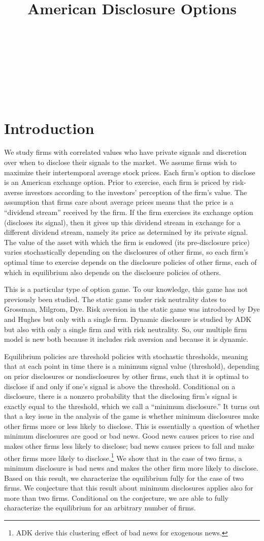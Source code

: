 \documentclass[authoryear,letterpaper,english,12pt]{elsarticle}
\title{American Disclosure Options}
\author[id=au1,addressref={add1}]{\fnms{Kerry}~\snm{Back}\ead[label=e1]{kerry.e.back@rice.edu}}
\author[id=au2,addressref={add2}]{\fnms{Bruce I.}~\snm{Carlin}\ead[label=e2]{bruce.carlin@rice.edu}}
\author[id=au3,addressref={add2}]{\fnms{Seyed Mohammad}~\snm{Kazempour}\ead[label=e3]{smkazempour@rice.edu}}
\author[id=au4,addressref={add3}]{\fnms{Chloe L.}~\snm{Xie}\ead[label=e4]{chloexie@mit.edu}}
\begin{document}
\newpage

\section{Introduction}\label{s:intro}

We study firms with correlated values who have private signals and discretion over when to disclose their signals to the market.  We assume firms wish to maximize their intertemporal average stock prices. Each firm's option to disclose is an American exchange option.  Prior to exercise, each firm is priced by risk-averse investors according to the investors' perception of the firm's value.  The assumption that firms care about average prices means that the price is a ``dividend stream'' received by the firm.  If the firm exercises its exchange option (discloses its signal), then it gives up this dividend stream in exchange for a different dividend stream, namely its price as determined by its private signal.  The value of the asset with which the firm is endowed (its pre-disclosure price) varies stochastically depending on the disclosures of other firms, so each firm's optimal time to exercise depends on the disclosure policies of other firms, each of which in equilibrium also depends on the disclosure policies of others.

This is a particular type of option game.  To our knowledge, this game has not previously been studied.  The static game under risk neutrality dates to Grossman, Milgrom, Dye.  Risk aversion in the static game was introduced by Dye and Hughes but only with a single firm.  Dynamic disclosure is studied by ADK but also with only a single firm and with risk neutrality.  So, our multiple firm model is new both because it includes risk aversion and because it is dynamic.

Equilibrium policies are threshold policies with stochastic thresholds, meaning that at each point in time there is a minimum signal value (threshold), depending on prior disclosures or nondisclosures by other firms, such that it is optimal to disclose if and only if one's signal is above the threshold.  Conditional on a disclosure, there is a nonzero probability that the disclosing firm's signal is exactly equal to the threshold, which we call a ``minimum disclosure.''  It turns out that a key issue in the analysis of the game is whether minimum disclosures make other firms more or less likely to disclose.  This is essentially a question of whether minimum disclosures are good or bad news.  Good news causes prices to rise and makes other firms less likely to disclose; bad news causes prices to fall and make other firms more likely to disclose.\footnote{ADK derive this clustering effect of bad news for exogenous news.}  We show that in the case of two firms, a minimum disclosure is bad news and makes the other firm more likely to disclose.  Based on this result, we characterize the equilibrium fully for the case of two firms.  We conjecture that this result about minimum disclosures applies also for more than two firms.  Conditional on the conjecture, we are able to fully characterize the equilibrium for an arbitrary number of firms.
\end{document}
